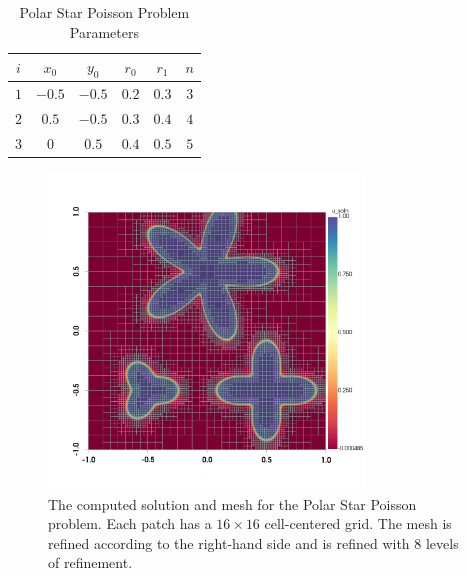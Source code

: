 \begin{table}[ht]
    \begin{center}
        \caption{Polar Star Poisson Problem Parameters}
        \begin{tabular}{|c|c|c|c|c|c|}
            \hline
            $i$ & $x_0$ & $y_0$ & $r_0$ & $r_1$ & $n$ \\
            \hline
            $1$ & $-0.5$ & $-0.5$ & $0.2$ & $0.3$ & $3$ \\
            $2$ & $0.5$ & $-0.5$ & $0.3$ & $0.4$ & $4$ \\
            $3$ & $0$ & $0.5$ & $0.4$ & $0.5$ & $5$ \\
            \hline
        \end{tabular}
        \label{table:polar_star_parameters}
    \end{center}
\end{table}

\begin{figure}
    \centering
    \includegraphics[width=0.75\textwidth, trim={0 100 0 0}]{../figures/plot_polar_star.png}
    \caption{The computed solution and mesh for the Polar Star Poisson problem. Each patch has a $16 \times 16$ cell-centered grid. The mesh is refined according to the right-hand side and is refined with 8 levels of refinement.}
    \label{fig:polar_star_plot}
\end{figure}

